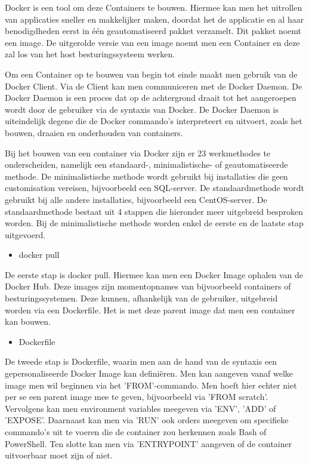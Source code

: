 Docker is een tool om deze Containers te bouwen. Hiermee kan men het uitrollen van applicaties sneller en makkelijker maken, doordat het de applicatie en al haar benodigdheden eerst in één geautomatiseerd pakket verzamelt. Dit pakket noemt een image. De uitgerolde versie van een image noemt men een Container en deze zal los van het host besturingssysteem werken.

Om een Container op te bouwen van begin tot einde maakt men gebruik van de Docker Client. Via de Client kan men communiceren met de Docker Daemon. De Docker Daemon is een proces dat op de achtergrond draait tot het aangeroepen wordt door de gebruiker via de syntaxis van Docker. De Docker Daemon is uiteindelijk degene die de Docker commando's interpreteert en uitvoert, zoals het bouwen, draaien en onderhouden van containers.

Bij het bouwen van een container via Docker zijn er 23 werkmethodes te onderscheiden, namelijk een standaard-, minimalistische- of geautomatiseerde methode. De minimalistische methode wordt gebruikt bij installaties die geen customisation vereisen, bijvoorbeeld een SQL-server. De standaardmethode wordt gebruikt bij alle andere installaties, bijvoorbeeld een CentOS-server. De standaardmethode bestaat uit 4 stappen die hieronder meer uitgebreid besproken worden. Bij de minimalistische methode worden enkel de eerste en de laatste stap uitgevoerd.

\begin{itemize}[noitemsep]
	\item docker pull
\end{itemize}
De eerste stap is docker pull. Hiermee kan men een Docker Image ophalen van de Docker Hub. Deze images zijn momentopnames van bijvoorbeeld containers of besturingssystemen. Deze kunnen, afhankelijk van de gebruiker, uitgebreid worden via een Dockerfile. Het is met deze parent image dat men een container kan bouwen.

\begin{itemize}[noitemsep]
	\item Dockerfile
\end{itemize}
De tweede stap is Dockerfile, waarin men aan de hand van de syntaxis een gepersonaliseerde Docker Image kan definiëren. Men kan aangeven vanaf welke image men wil beginnen via het 'FROM'-commando. Men hoeft hier echter niet per se een parent image mee te geven, bijvoorbeeld via 'FROM scratch'. Vervolgens kan men environment variables meegeven via 'ENV', 'ADD' of 'EXPOSE'. Daarnaast kan men via 'RUN' ook orders meegeven om specifieke commando's uit te voeren die de container zou herkennen zoals Bash of PowerShell. Ten slotte kan men via 'ENTRYPOINT' aangeven of de container uitvoerbaar moet zijn of niet.


